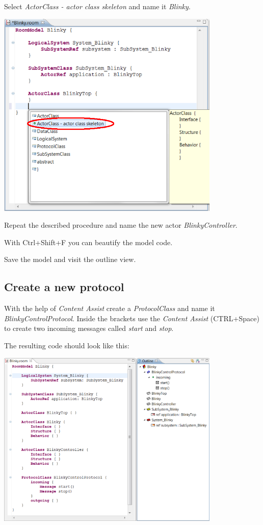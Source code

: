 Select \textit{ActorClass - actor class skeleton} and name it \textit{Blinky}.

\includegraphics[width=0.8\textwidth]{images/020-Blinky01.png}

Repeat the described procedure and name the new actor \textit{BlinkyController}.

With Ctrl+Shift+F you can beautify the model code. 

Save the model and visit the outline view.

\subsection{Create a new protocol}

With the help of \textit{Content Assist} create a \textit{ProtocolClass} and name it 
\textit{BlinkyControlProtocol}.
Inside the brackets use the \textit{Content Assist} (CTRL+Space) to create two incoming messages called 
\textit{start} and \textit{stop}.

The resulting code should look like this:

\includegraphics[width=0.8\textwidth]{images/020-Blinky03.png}

